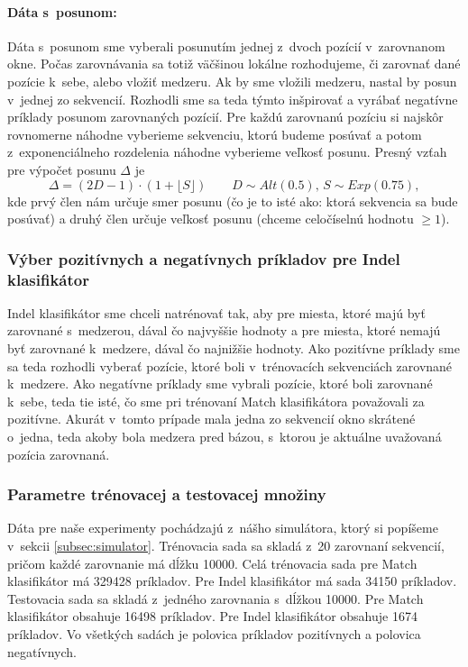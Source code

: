 \paragraph{Dáta s~posunom:} Dáta s~posunom sme vyberali posunutím jednej z~dvoch pozícií v~zarovnanom okne.
Počas zarovnávania sa totiž väčšinou lokálne rozhodujeme, či zarovnať dané pozície k~sebe, alebo vložiť medzeru. Ak by sme vložili medzeru, nastal by posun v~jednej zo sekvencií. Rozhodli sme sa teda týmto inšpirovať a vyrábať negatívne príklady posunom zarovnaných pozícií. Pre každú zarovnanú pozíciu si najskôr rovnomerne náhodne vyberieme sekvenciu, ktorú budeme posúvať a potom z~exponenciálneho rozdelenia náhodne vyberieme veľkosť posunu. Presný vzťah pre výpočet posunu $\Delta$ je
$$\Delta = \left(2D-1\right)\cdot \left(1+\lfloor S\rfloor\right)\qquad D\sim Alt(0.5),\, S\sim Exp(0.75),$$
kde prvý člen nám určuje smer posunu (čo je to isté ako: ktorá sekvencia sa bude posúvať) a druhý člen určuje veľkosť posunu (chceme celočíselnú hodnotu $\geq 1$).

\subsubsection{Výber pozitívnych a negatívnych príkladov pre Indel klasifikátor}

Indel klasifikátor sme chceli natrénovať tak, aby pre miesta, ktoré majú byť zarovnané s~medzerou, dával čo najvyššie hodnoty a pre miesta, ktoré nemajú byť zarovnané k~medzere, dával čo najnižšie hodnoty. Ako pozitívne príklady sme sa teda rozhodli vyberať pozície, ktoré boli v~trénovacích sekvenciách zarovnané k~medzere. Ako negatívne príklady sme vybrali pozície, ktoré boli zarovnané k~sebe, teda tie isté, čo sme pri trénovaní Match klasifikátora považovali za pozitívne. Akurát v~tomto prípade mala jedna zo sekvencií okno skrátené o~jedna, teda akoby bola medzera pred bázou, s~ktorou je aktuálne uvažovaná pozícia zarovnaná.

\subsubsection{Parametre trénovacej a testovacej množiny}
\label{subsec:clf-training-sets}
Dáta pre naše experimenty pochádzajú z~nášho simulátora, ktorý si popíšeme v~sekcii \ref{subsec:simulator}. Trénovacia sada sa skladá z~20 zarovnaní sekvencií, pričom každé zarovnanie má dĺžku 10000. Celá trénovacia sada pre Match klasifikátor má 329428 príkladov. Pre Indel klasifikátor má sada 34150 príkladov.
Testovacia sada sa skladá z~jedného zarovnania s~dĺžkou 10000. Pre Match klasifikátor obsahuje 16498 príkladov. Pre Indel klasifikátor obsahuje 1674 príkladov.
Vo všetkých sadách je polovica príkladov pozitívnych a polovica negatívnych.

